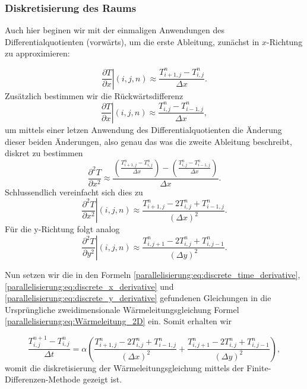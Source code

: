 \subsubsection{Diskretisierung des Raums}
Auch hier beginen wir mit der einmaligen Anwendungen des Differentialquotienten (vorwärts), um die erste Ableitung, zunächst in $x$-Richtung zu approximieren:

\begin{equation}
	\left. \frac{\partial T}{\partial x} \right|{(i,j,n)}
	\approx \frac{T_{i+1,j}^n - T_{i,j}^n}{\Delta x}.
\end{equation}
Zusätzlich bestimmen wir die Rückwärtsdifferenz
\begin{equation}
	\left. \frac{\partial T}{\partial x} \right|{(i,j,n)}
	\approx \frac{T_{i,j}^n - T_{i-1,j}^n}{\Delta x},
\end{equation}
um mittels einer letzen Anwendung des Differentialquotienten die Änderung dieser beiden Änderungen, also genau das was die zweite Ableitung beschreibt, diskret zu bestimmen
\begin{equation}
	\frac{\partial^2 T}{\partial x^2} \approx
	\frac{ \left( \frac{T_{i+1,j}^n - T_{i,j}^n}{\Delta x} \right) - \left( \frac{T_{i,j}^n - T_{i-1,j}^n}{\Delta x} \right) }{\Delta x}.
\end{equation}
Schlussendlich vereinfacht sich dies zu 
\begin{equation}
	\label{parallelisierung:eq:discrete_x_derivative}
	\left. \frac{\partial^2 T}{\partial x^2} \right|{(i,j,n)} \approx \frac{T_{i+1,j}^n - 2T_{i,j}^n + T_{i-1,j}^n}{(\Delta x)^2}.
\end{equation}
Für die y-Richtung folgt analog
\begin{equation}
	\label{parallelisierung:eq:discrete_y_derivative}
	\left. \frac{\partial^2 T}{\partial y^2} \right|{(i,j,n)} \approx \frac{T_{i,j+1}^n - 2T_{i,j}^n + T_{i,j-1}^n}{(\Delta y)^2}.
\end{equation}


Nun setzen wir die in den Formeln \eqref{parallelisierung:eq:discrete_time_derivative},  \eqref{parallelisierung:eq:discrete_x_derivative} und \eqref{parallelisierung:eq:discrete_y_derivative} gefundenen Gleichungen in die Ursprüngliche zweidimensionale Wärmeleitungsgleichung Formel \eqref{parallelisierung:eq:Wärmeleitung_2D} ein.
Somit erhalten wir 

\begin{equation}
	\label{parallelisierung:eq:update_formula_unsorted}
	\frac{T_{i,j}^{n+1} - T_{i,j}^n}{\Delta t}
	=
	\alpha \left(
	\frac{T_{i+1,j}^n - 2 T_{i,j}^n + T_{i-1,j}^n}{(\Delta x)^2}
	+
	\frac{T_{i,j+1}^n - 2 T_{i,j}^n + T_{i,j-1}^n}{(\Delta y)^2}
	\right),
\end{equation}
womit die diskretisierung der Wärmeleitungsgleichung mittels der Finite-Differenzen-Methode gezeigt ist.

